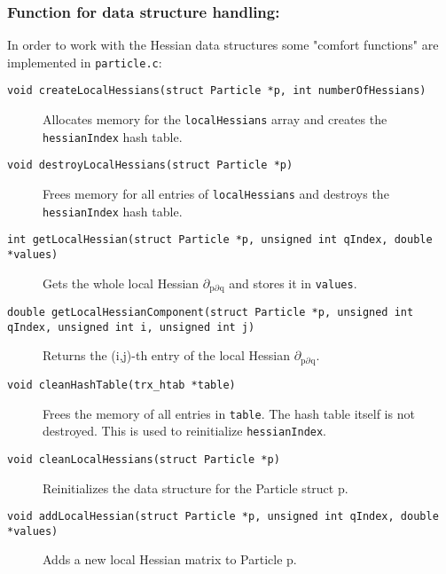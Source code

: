 \documentclass[11pt]{article}
\begin{document}
\subsubsection{Function for data structure handling:}
\label{sec-1-1-2}
In order to work with the Hessian data structures some "comfort functions" are implemented in \texttt{particle.c}:
\begin{description}
\item[{\texttt{void createLocalHessians(struct Particle *p, int numberOfHessians)}}] Allocates memory for the \texttt{localHessians} array and creates the \texttt{hessianIndex} hash table.
\item[{\texttt{void destroyLocalHessians(struct Particle *p)}}] Frees memory for all entries of \texttt{localHessians} and destroys the \texttt{hessianIndex} hash table.
\item[{\texttt{int getLocalHessian(struct Particle *p, unsigned int qIndex, double *values)}}] Gets the whole local Hessian $\partial$$_{\text{p}\partial}$$_{\text{q}}$ and stores it in \texttt{values}.
\item[{\texttt{double getLocalHessianComponent(struct Particle *p, unsigned int qIndex, unsigned int i, unsigned int j)}}] Returns the (i,j)-th entry of the local Hessian $\partial$$_{\text{p}\partial}$$_{\text{q}}$.
\item[{\texttt{void cleanHashTable(trx\_htab *table)}}] Frees the memory of all entries in \texttt{table}. The hash table itself is not destroyed. This is used to reinitialize \texttt{hessianIndex}.
\item[{\texttt{void cleanLocalHessians(struct Particle *p)}}] Reinitializes the data structure for the Particle struct p.
\item[{\texttt{void addLocalHessian(struct Particle *p, unsigned int qIndex, double *values)}}] Adds a new local Hessian matrix to Particle p.
\end{description}
\end{document}
